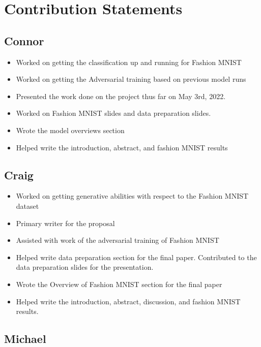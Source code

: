 \documentclass[conference]{IEEEtran}
\begin{document}
\section*{Contribution Statements}

\subsection{Connor}

\begin{itemize}
    \item Worked on getting the classification up and running for Fashion MNIST
    \item Worked on getting the Adversarial training based on previous model runs
    \item Presented the work done on the project thus far on May 3rd, 2022.
    \item Worked on Fashion MNIST slides and data preparation slides.
    \item Wrote the model overviews section
    \item Helped write the introduction, abstract, and fashion MNIST results
\end{itemize}

\subsection{Craig} 

\begin{itemize}
    \item Worked on getting generative abilities with respect to the Fashion MNIST dataset
    \item Primary writer for the proposal
    \item Assisted with work of the adversarial training of Fashion MNIST
    \item Helped write data preparation section for the final paper. Contributed to the data preparation slides for the presentation.
    \item Wrote the Overview of Fashion MNIST section for the final paper
    \item Helped write the introduction, abstract, discussion, and fashion MNIST results.
\end{itemize}

\subsection{Michael} 
\end{document}
